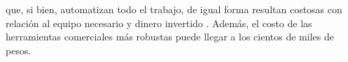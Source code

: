que, si bien, automatizan todo el trabajo, de igual forma resultan costosas con relación al equipo necesario y dinero invertido \cite{refi6}.
Además, el costo de las herramientas comerciales más robustas puede llegar a los cientos de miles de pesos.
\\
